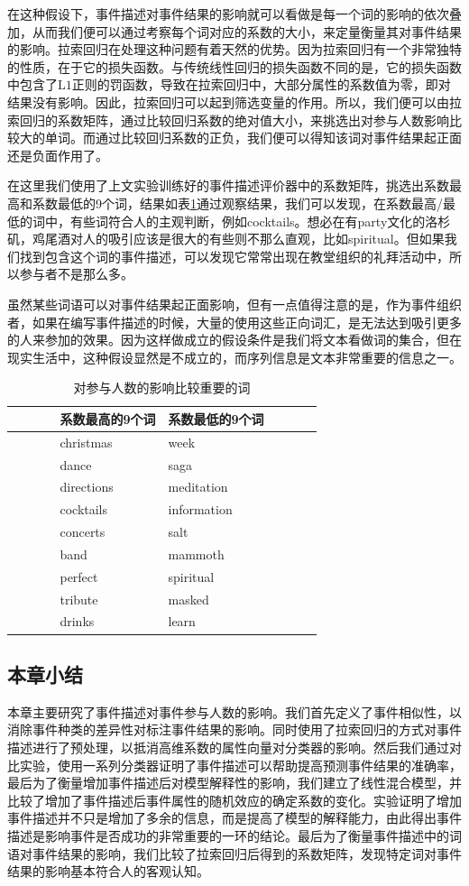 在这种假设下，事件描述对事件结果的影响就可以看做是每一个词的影响的依次叠加，从而我们便可以通过考察每个词对应的系数的大小，来定量衡量其对事件结果的影响。拉索回归在处理这种问题有着天然的优势。因为拉索回归有一个非常独特的性质，在于它的损失函数。与传统线性回归的损失函数不同的是，它的损失函数中包含了$\mathrm{L1}$正则的罚函数，导致在拉索回归中，大部分属性的系数值为零，即对结果没有影响。因此，拉索回归可以起到筛选变量的作用\citep{tibshirani_regression_1996}。所以，我们便可以由拉索回归的系数矩阵，通过比较回归系数的绝对值大小，来挑选出对参与人数影响比较大的单词。而通过比较回归系数的正负，我们便可以得知该词对事件结果起正面还是负面作用了\citep{noauthor_predicting_nodate}。

在这里我们使用了上文实验训练好的事件描述评价器中的系数矩阵，挑选出系数最高和系数最低的9个词，结果如表\ref{t1-2}通过观察结果，我们可以发现，在系数最高/最低的词中，有些词符合人的主观判断，例如cocktails。想必在有party文化的洛杉矶，鸡尾酒对人的吸引应该是很大的有些则不那么直观，比如spiritual。但如果我们找到包含这个词的事件描述，可以发现它常常出现在教堂组织的礼拜活动中，所以参与者不是那么多。

虽然某些词语可以对事件结果起正面影响，但有一点值得注意的是，作为事件组织者，如果在编写事件描述的时候，大量的使用这些正向词汇，是无法达到吸引更多的人来参加的效果。因为这样做成立的假设条件是我们将文本看做词的集合，但在现实生活中，这种假设显然是不成立的，而序列信息是文本非常重要的信息之一。

\begin{table}[htbp]
  \caption{\label{t1-2}对参与人数的影响比较重要的词}
    \centering
      \begin{tabular*}{\linewidth}{p{0.15\linewidth}p{0.35\linewidth}p{0.35\linewidth}p{0.15\linewidth}}
  \toprule      
      &系数最高的9个词 & 系数最低的9个词&\tabularnewline
  \midrule
  &christmas & week&\tabularnewline
  &dance & saga&\tabularnewline
  &directions & meditation&\tabularnewline
  &cocktails & information&\tabularnewline
  &concerts & salt&\tabularnewline
  &band & mammoth&\tabularnewline
  &perfect & spiritual&\tabularnewline
  &tribute & masked&\tabularnewline
  &drinks & learn&\tabularnewline
  \bottomrule
      \end{tabular*}
  \end{table}

\subsection{本章小结}
本章主要研究了事件描述对事件参与人数的影响。我们首先定义了事件相似性，以消除事件种类的差异性对标注事件结果的影响。同时使用了拉索回归的方式对事件描述进行了预处理，以抵消高维系数的属性向量对分类器的影响。然后我们通过对比实验，使用一系列分类器证明了事件描述可以帮助提高预测事件结果的准确率，最后为了衡量增加事件描述后对模型解释性的影响，我们建立了线性混合模型，并比较了增加了事件描述后事件属性的随机效应的确定系数的变化。实验证明了增加事件描述并不只是增加了多余的信息，而是提高了模型的解释能力，由此得出事件描述是影响事件是否成功的非常重要的一环的结论。最后为了衡量事件描述中的词语对事件结果的影响，我们比较了拉索回归后得到的系数矩阵，发现特定词对事件结果的影响基本符合人的客观认知。


